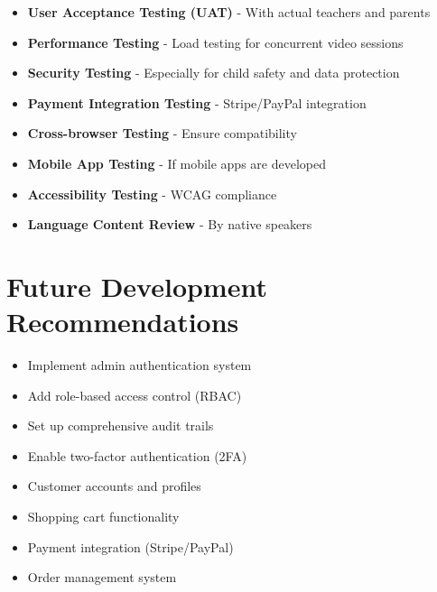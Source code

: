\documentclass[11pt,a4paper]{article}
\begin{document}
\begin{itemize}[leftmargin=*]
    \item \textbf{User Acceptance Testing (UAT)} - With actual teachers and parents
    \item \textbf{Performance Testing} - Load testing for concurrent video sessions
    \item \textbf{Security Testing} - Especially for child safety and data protection
    \item \textbf{Payment Integration Testing} - Stripe/PayPal integration
    \item \textbf{Cross-browser Testing} - Ensure compatibility
    \item \textbf{Mobile App Testing} - If mobile apps are developed
    \item \textbf{Accessibility Testing} - WCAG compliance
    \item \textbf{Language Content Review} - By native speakers
\end{itemize}

\section{Future Development Recommendations}

\begin{tcolorbox}[colback=ispeak-purple!10, colframe=ispeak-purple, title=\textbf{Phase 1: Security \& Authentication}]
\begin{itemize}[leftmargin=*]
    \item Implement admin authentication system
    \item Add role-based access control (RBAC)
    \item Set up comprehensive audit trails
    \item Enable two-factor authentication (2FA)
\end{itemize}
\end{tcolorbox}

\begin{tcolorbox}[colback=ispeak-teal!10, colframe=ispeak-teal, title=\textbf{Phase 2: Enhanced Features}]
\begin{itemize}[leftmargin=*]
    \item Customer accounts and profiles
    \item Shopping cart functionality
    \item Payment integration (Stripe/PayPal)
    \item Order management system
\end{itemize}
\end{tcolorbox}
\end{document}
